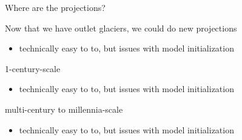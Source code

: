 \documentclass[shownotes notes,intlimits]{beamer}
\begin{document}
  {
} 

\begin{frame}{Where are the projections?}

\begin{block}{Now that we have outlet glaciers, we could do new projections}
  \begin{itemize}
  \item technically easy to to, but issues with model initialization
  \end{itemize}
\end{block}

\begin{block}{1-century-scale}
  \begin{itemize}
  \item technically easy to to, but issues with model initialization
  \end{itemize}
\end{block}


\begin{block}{multi-century to millennia-scale}
  \begin{itemize}
  \item technically easy to to, but issues with model initialization
  \end{itemize}
\end{block}
\end{frame}

{
%
} 
\end{document}
